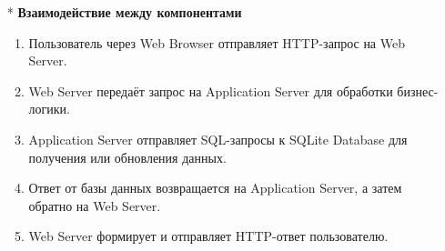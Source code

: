 \documentclass[a4paper]{report}
\begin{document}
\begin{enumerate}
    \item[*]\textbf{Взаимодействие между компонентами}\\
    \begin{enumerate}
        \item Пользователь через Web Browser отправляет HTTP-запрос на Web Server.
        \item Web Server передаёт запрос на Application Server для обработки бизнес-логики.
        \item Application Server отправляет SQL-запросы к SQLite Database для получения или обновления данных.
        \item Ответ от базы данных возвращается на Application Server, а затем обратно на Web Server.
        \item Web Server формирует и отправляет HTTP-ответ пользователю.
    \end{enumerate}
\end{enumerate} 
\end{document}
